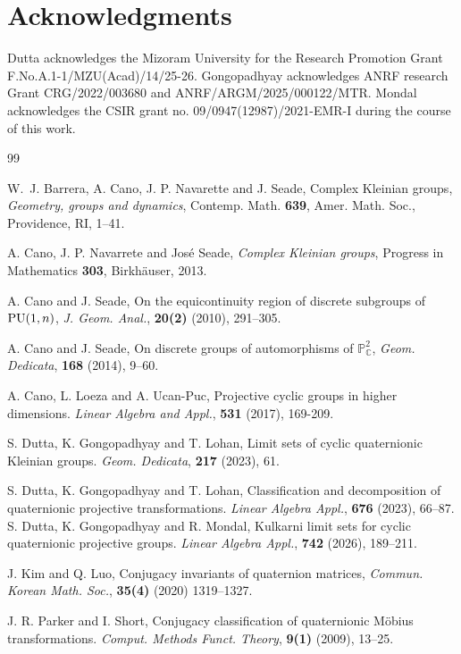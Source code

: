 \documentclass[12pt,reqno]{amsart}
\numberwithin{equation}{section}
\theoremstyle{definition}
\begin{document}
    \section*{Acknowledgments}
		Dutta acknowledges the Mizoram University for the Research Promotion Grant F.No.A.1-1/MZU(Acad)/14/25-26. Gongopadhyay acknowledges ANRF research Grant CRG/2022/003680 and ANRF/ARGM/2025/000122/MTR. Mondal acknowledges the  CSIR grant no. 09/0947(12987)/2021-EMR-I during the course of this work.  
		\begin{thebibliography}{99} 
	      
         W.~J. Barrera, A. Cano, J. P. Navarette and J. Seade, Complex Kleinian groups, {\it Geometry, groups and dynamics}, Contemp. Math. {\bf 639}, Amer. Math. Soc., Providence, RI, 1--41. 
 
             A. Cano, J. P. Navarrete and Jos\'{e} Seade, {\it Complex {K}leinian groups},  Progress in Mathematics {\bf 303}, Birkh\"{a}user, 2013.
			
			   A. Cano and J. Seade, {On the equicontinuity region of discrete subgroups of {${\rm PU}(1,n)$}}, {\it J. Geom. Anal.},  {\bf 20(2)} (2010), 291--305.
			
			   A. Cano and  J. Seade, { On discrete groups of automorphisms of $\mathbb{P}^2_\mathbb{C}$}, {\it Geom. Dedicata},  {\bf 168} (2014), 9--60.
			
			 A. Cano, L. Loeza and A. Ucan-Puc, Projective cyclic groups in higher dimensions. {\it Linear Algebra and Appl.}, {\bf 531} (2017), 169-209.
            
			 S. Dutta, K. Gongopadhyay and  T. Lohan, Limit sets of cyclic quaternionic Kleinian groups. {\it Geom. Dedicata}, {\bf 217} (2023), 61. 
            
	 S. Dutta,  K.  Gongopadhyay and  T.  Lohan,  Classification and decomposition of quaternionic projective transformations. {\it Linear Algebra Appl.},  {\bf 676} (2023), 66--87. 
             S. Dutta, K. Gongopadhyay and  R. Mondal, Kulkarni limit sets for cyclic quaternionic projective groups. {\it Linear Algebra Appl.},  {\bf 742} (2026), 189--211. 
            
         J. Kim and Q. Luo, Conjugacy invariants of quaternion matrices, {\it Commun. Korean Math. Soc.}, {\bf 35(4)} (2020) 1319--1327.
		
		 J. R. Parker and  I. Short, Conjugacy classification of quaternionic M\"{o}bius transformations. {\it Comput. Methods Funct. Theory},  {\bf 9(1)} (2009), 13--25. 
        

\end{thebibliography}
\end{document}
